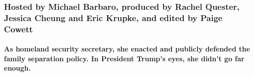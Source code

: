 \hypertarget{hosted-by-michael-barbaro-produced-by-rachel-quester-jessica-cheung-and-eric-krupke-and-edited-by-paige-cowett}{%
\subsubsection{Hosted by Michael Barbaro, produced by Rachel Quester,
Jessica Cheung and Eric Krupke, and edited by Paige
Cowett}\label{hosted-by-michael-barbaro-produced-by-rachel-quester-jessica-cheung-and-eric-krupke-and-edited-by-paige-cowett}}

\hypertarget{as-homeland-security-secretary-she-enacted-and-publicly-defended-the-family-separation-policy-in-president-trumps-eyes-she-didnt-go-far-enough}{%
\paragraph{As homeland security secretary, she enacted and publicly
defended the family separation policy. In President Trump's eyes, she
didn't go far
enough.}\label{as-homeland-security-secretary-she-enacted-and-publicly-defended-the-family-separation-policy-in-president-trumps-eyes-she-didnt-go-far-enough}}

